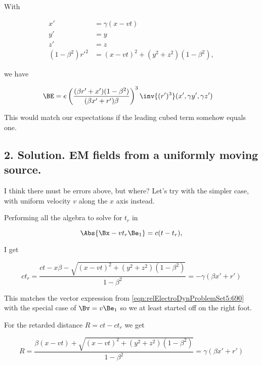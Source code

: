 With

\begin{align}\label{eqn:relativisticElectrodynamicsL20:840}
x' &= \gamma( x - v t) \\
y' &= y \\
z' &= z \\
(1 - \beta^2) {r'}^2 &= (x - v t)^2 + (y^2 + z^2)(1 - \beta^2),
\end{align}

we have

\begin{align*}
\BE
&= 
e 
\left(\frac{ (\beta r' + x')(1- \beta^2) }
{ (\beta x' + r')\beta }
\right)^3
\inv{(r')^3}(x', \gamma y', \gamma z')
\end{align*}

This would match our expectations if the leading cubed term somehow equals one.

\subsection{2. Solution.  EM fields from a uniformly moving source.}

I think there must be errors above, but where?  Let's try with the simpler case, with uniform velocity $v$ along the $x$ axis instead.

Performing all the algebra to solve for $t_r$ in 

\begin{equation}\label{eqn:relElectroDynProblemSet5:860}
\Abs{\Bx - v t_r \Be_1} = c(t - t_r),
\end{equation}

I get

\begin{equation}\label{eqn:relElectroDynProblemSet5:880}
c t_r = \frac{c t - x \beta - \sqrt{ (x- v t)^2 + (y^2 + z^2)(1-\beta^2) } }{ 1 - \beta^2 } = - \gamma (\beta x' + r' )
\end{equation}

This matches the vector expression from \ref{eqn:relElectroDynProblemSet5:690} with the special case of $\Bv = v \Be_1$ so we at least started off on the right foot.

For the retarded distance $R = ct - c t_r$ we get

\begin{equation}\label{eqn:relElectroDynProblemSet5:900}
R = \frac{ \beta( x - v t) + \sqrt{ (x- v t)^2 + (y^2 + z^2)(1-\beta^2) } }{ 1 - \beta^2 } = \gamma( \beta x' + r' )
\end{equation}

